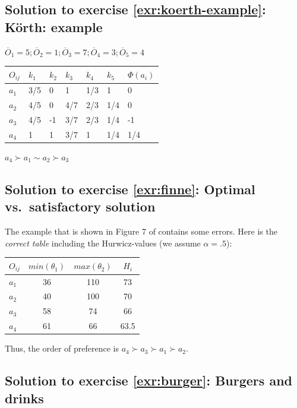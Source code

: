 \documentclass[
  12pt,
  oneside]{book}
\theoremstyle{definition}
\theoremstyle{definition}
\theoremstyle{definition}
\theoremstyle{definition}
\theoremstyle{remark}
\begin{document}
\hypertarget{sol:koerth-example}{%
\subsection*{Solution to exercise \ref{exr:koerth-example}: Körth: example}\label{sol:koerth-example}}

\(\overline{O}_1=5; \overline{O}_2=1; \overline{O}_3=7; \overline{O}_4=3; \overline{O}_5=4\)

\begin{longtable}[]{@{}lllllll@{}}
\toprule()
\(O_{ij}\) & \(k_1\) & \(k_2\) & \(k_3\) & \(k_4\) & \(k_5\) & \(\Phi(a_i)\) \\
\midrule()
\endhead
\(a_1\) & 3/5 & 0 & 1 & 1/3 & 1 & 0 \\
\(a_2\) & 4/5 & 0 & 4/7 & 2/3 & 1/4 & 0 \\
\(a_3\) & 4/5 & -1 & 3/7 & 2/3 & 1/4 & -1 \\
\(a_4\) & 1 & 1 & 3/7 & 1 & 1/4 & 1/4 \\
\bottomrule()
\end{longtable}

\(a_4\succ a_1 \sim a_2 \succ a_3\)

\hypertarget{sol:finne}{%
\subsection*{Solution to exercise \ref{exr:finne}: Optimal vs.~satisfactory solution}\label{sol:finne}}

The example that is shown in Figure 7 of \citet[p.~401]{Finne1998three} contains some errors. Here is the \emph{correct table} including the Hurwicz-values (we assume \(\alpha=.5\)):

\begin{longtable}[]{@{}lccc@{}}
\toprule()
\(O_{ij}\) & \(min(\theta_1)\) & \(max(\theta_2)\) & \(H_i\) \\
\midrule()
\endhead
\(a_1\) & 36 & 110 & 73 \\
\(a_2\) & 40 & 100 & 70 \\
\(a_3\) & 58 & 74 & 66 \\
\(a_4\) & 61 & 66 & 63.5 \\
\bottomrule()
\end{longtable}

Thus, the order of preference is \(a_4\succ a_3 \succ a_1 \succ a_2\).

\hypertarget{sol:burger}{%
\subsection*{Solution to exercise \ref{exr:burger}: Burgers and drinks}\label{sol:burger}}
\end{document}
